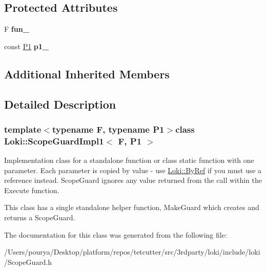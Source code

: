 \subsection*{Protected Attributes}
\begin{DoxyCompactItemize}
\item 
\hypertarget{classLoki_1_1ScopeGuardImpl1_a30a6ecc26d180c918719aaab7783e916}{}F {\bfseries fun\+\_\+}\label{classLoki_1_1ScopeGuardImpl1_a30a6ecc26d180c918719aaab7783e916}

\item 
\hypertarget{classLoki_1_1ScopeGuardImpl1_ae9088062c55c187a49154b9eca780c32}{}const \hyperlink{structP1}{P1} {\bfseries p1\+\_\+}\label{classLoki_1_1ScopeGuardImpl1_ae9088062c55c187a49154b9eca780c32}

\end{DoxyCompactItemize}
\subsection*{Additional Inherited Members}


\subsection{Detailed Description}
\subsubsection*{template$<$typename F, typename P1$>$class Loki\+::\+Scope\+Guard\+Impl1$<$ F, P1 $>$}

Implementation class for a standalone function or class static function with one parameter. Each parameter is copied by value -\/ use \hyperlink{group__ExceptionGroup_ga0a94ba0342e6abcdb8f9b32ed5ad7e3d}{Loki\+::\+By\+Ref} if you must use a reference instead. Scope\+Guard ignores any value returned from the call within the Execute function.

This class has a single standalone helper function, Make\+Guard which creates and returns a Scope\+Guard. 

The documentation for this class was generated from the following file\+:\begin{DoxyCompactItemize}
\item 
/\+Users/pourya/\+Desktop/platform/repos/tetcutter/src/3rdparty/loki/include/loki/Scope\+Guard.\+h\end{DoxyCompactItemize}
